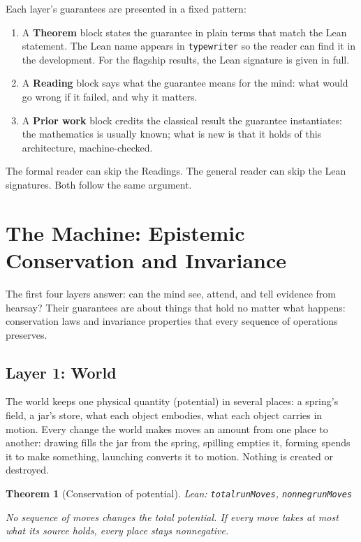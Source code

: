 \documentclass[11pt]{article}
\newcommand{\leanus}{\textunderscore\allowbreak}
\newcommand{\lean}[1]{{\let\_\leanus\texttt{#1}}}
\newtheorem{theorem}{Theorem}[section]
\theoremstyle{remark}
\begin{document}
Each layer's guarantees are presented in a fixed pattern:

\begin{enumerate}[nosep]
    \item A \textbf{Theorem} block states the guarantee in plain terms that match the Lean
    statement. The Lean name appears in \lean{typewriter} so the reader can find it in the
    development. For the flagship results, the Lean signature is given in full.
    \item A \textbf{Reading} block says what the guarantee means for the mind: what would
    go wrong if it failed, and why it matters.
    \item A \textbf{Prior work} block credits the classical result the guarantee
    instantiates: the mathematics is usually known; what is new is that it holds of this
    architecture, machine-checked.
\end{enumerate}

The formal reader can skip the Readings. The general reader can skip the Lean signatures.
Both follow the same argument.


\section{The Machine: Epistemic Conservation and Invariance}
\label{sec:machine}

The first four layers answer: can the mind see, attend, and tell evidence from hearsay?
Their guarantees are about things that hold no matter what happens: conservation laws and
invariance properties that every sequence of operations preserves.

\subsection{Layer 1: World}

The world keeps one physical quantity (potential) in several places: a spring's field, a
jar's store, what each object embodies, what each object carries in motion. Every change
the world makes moves an amount from one place to another: drawing fills the jar from the
spring, spilling empties it, forming spends it to make something, launching converts it to
motion. Nothing is created or destroyed.

\begin{theorem}[Conservation of potential]
{\small\sloppy Lean: \lean{total\_runMoves}, \lean{nonneg\_runMoves}\par}
No sequence of moves changes the total potential. If every move takes at most what its
source holds, every place stays nonnegative.
\end{theorem}
\end{document}
